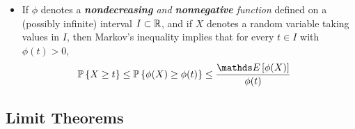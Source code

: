 \documentclass[11pt]{article}
\begin{document}
\begin{itemize}
\item  \begin{remark}
If $\phi$ denotes a \emph{\textbf{nondecreasing} and \textbf{nonnegative} function} defined on a (possibly infinite) interval $I \subset {\mathbb R}$, and if $X$ denotes a random variable taking values in $I$, then Markov's inequality implies that for every $t \in I$ with $\phi(t) > 0$,
\begin{align}
\bP\set{X \ge t} \le \bP\set{\phi(X) \ge \phi(t)} &\le \frac{\E{}{\phi(X)}}{\phi(t)}  \label{ineqn: generalized_markov_inequality}
\end{align}
\end{remark}
\end{itemize}
\subsection{Limit Theorems}
\end{document}
